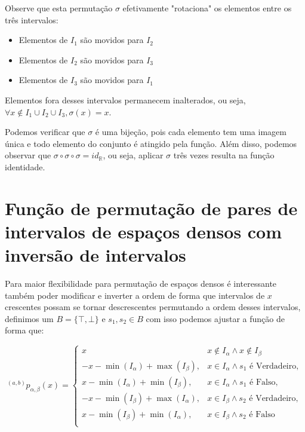 \documentclass[12pt,a4paper]{article}
\begin{document}
Observe que esta permutação $\sigma$ efetivamente "rotaciona" os elementos entre os três intervalos:
\begin{itemize}
\item Elementos de $I_1$ são movidos para $I_2$
\item Elementos de $I_2$ são movidos para $I_3$
\item Elementos de $I_3$ são movidos para $I_1$
\end{itemize}

Elementos fora desses intervalos permanecem inalterados, ou seja, $\forall x \not\in I_1 \cup I_2 \cup I_3, \sigma(x) = x$.

Podemos verificar que $\sigma$ é uma bijeção, pois cada elemento tem uma imagem única e todo elemento do conjunto é atingido pela função. Além disso, podemos observar que $\sigma \circ \sigma \circ \sigma = id_{\mathbb{R}}$, ou seja, aplicar $\sigma$ três vezes resulta na função identidade.

\section{Função de permutação de pares de intervalos de espaços densos com inversão de intervalos}

Para maior flexibilidade para permutação de espaços densos é interessante também poder modificar e inverter a ordem
de forma que intervalos de $x$ crescentes possam se tornar descrescentes permutando a ordem desses intervalos, definimos um $B=\{\top, \bot\}$ e $s_1,s_2 \in B$ com isso podemos ajustar a função de forma que:

\begin{equation}
   {}^{(a,b)}p_{\alpha,\beta}{(x)} = \begin{cases} 
      x & x \not\in I_{\alpha} \land x \not \in I_{\beta}\\
      - x - \min(I_{\alpha}) + \max(I_{\beta}), & x \in I_{\alpha} \land s_1 \text{ é Verdadeiro},\\
      x - \min(I_{\alpha}) + \min(I_{\beta}), & x \in I_{\alpha} \land s_1 \text{ é Falso},\\
      - x - \min(I_{\beta}) + \max(I_{\alpha}), & x \in I_{\beta} \land s_2 \text{ é Verdadeiro},\\
      x - \min(I_{\beta}) + \min(I_{\alpha}), & x \in I_{\beta} \land s_2 \text{ é Falso}\\
  \end{cases}
\end{equation}
\end{document}
